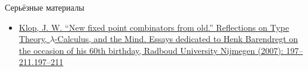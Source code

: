     \begin{frame}{Серьёзные материалы}
        \begin{itemize}
            \item \href{http://www.cs.ru.nl/barendregt60/essays/klop/art16_klop.pdf}{\color{blue} Klop, J. W. ``New fixed point combinators from old.'' Reflections on Type Theory, $\lambda$-Calculus, and the Mind. Essays dedicated to Henk Barendregt on the occasion of his 60th birthday, Radboud University Nijmegen (2007): 197--211.197--211}
        \end{itemize}
    \end{frame}


